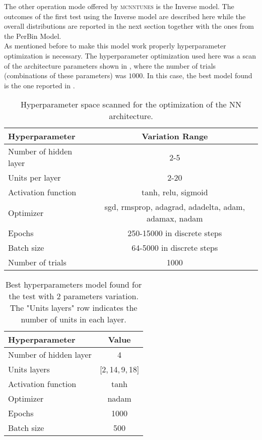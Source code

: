 The other operation mode offered by \textsc{mcnntunes} is the Inverse model. 
The outcomes of the first test using the Inverse model are described here while the overall distributions are reported in the next section together with the ones from the PerBin Model. 
\\
As mentioned before to make this model work properly hyperparameter optimization is necessary. The hyperparameter optimization used here was a scan of the architecture parameters shown in , where the number of trials (combinations of these parameters) was $1000$. In this case, the best model found is the one reported in .
\begin{table}[!htb]
	\centering
	\begin{tabular}{| l | c |}
	\hline
	Hyperparameter & Variation Range\\[2pt]\hline
	Number of hidden layer & 2-5 \\[2pt]
	Units per layer & 2-20 \\[2pt]
	Activation function & tanh, relu, sigmoid \\[2pt]
	Optimizer & {\small sgd, rmsprop, adagrad, adadelta, adam, adamax, nadam}\\[2pt]
	Epochs & 250-15000 in discrete steps\\[2pt]
	Batch size & 64-5000 in discrete steps\\[2pt] \hline
	Number of trials & 1000\\[2pt]\hline
	\end{tabular}
	\caption{Hyperparameter space scanned for the optimization of the NN architecture.}
	\label{table:hyperpar_MinBias_2par}
\end{table}


\begin{table}[!htb]
	\centering
	\begin{tabular}{ l | c }
	Hyperparameter & Value\\[2pt]\hline\hline
	Number of hidden layer & 4 \\[2pt]
	Units layers & [2,\,14,\,9,\,18] \\[2pt]
	Activation function & tanh \\[2pt]
	Optimizer & nadam\\[2pt]
	Epochs & 1000\\[2pt]
	Batch size & 500\\[2pt]
	\end{tabular}
	\caption{Best hyperparameters model found for the test with 2 parameters variation. The "Units layers" row indicates the number of units in each layer.}
	\label{table:hyperpar_2parTEST}
\end{table}

